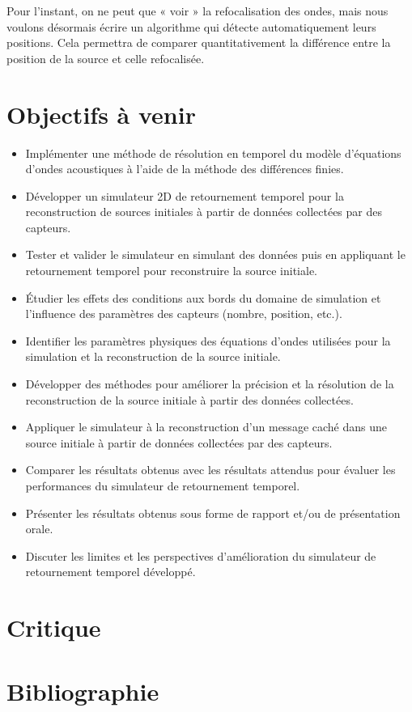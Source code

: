 \documentclass[11pt, a4paper]{article}
\begin{document}
Pour l'instant, on ne peut que « voir » la refocalisation des ondes, mais nous voulons désormais écrire un algorithme qui détecte automatiquement leurs positions. Cela permettra de comparer quantitativement la différence entre la position de la source et celle refocalisée.

\section{Objectifs à venir}
\begin{itemize}
    \item Implémenter une méthode de résolution en temporel du modèle d'équations d'ondes acoustiques à l'aide de la méthode des différences finies.
    \item Développer un simulateur 2D de retournement temporel pour la reconstruction de sources initiales à partir de données collectées par des capteurs.
    \item Tester et valider le simulateur en simulant des données puis en appliquant le retournement temporel pour reconstruire la source initiale.
    \item Étudier les effets des conditions aux bords du domaine de simulation et l'influence des paramètres des capteurs (nombre, position, etc.).
    \item Identifier les paramètres physiques des équations d'ondes utilisées pour la simulation et la reconstruction de la source initiale.
    \item Développer des méthodes pour améliorer la précision et la résolution de la reconstruction de la source initiale à partir des données collectées.
    \item Appliquer le simulateur à la reconstruction d'un message caché dans une source initiale à partir de données collectées par des capteurs.
    \item Comparer les résultats obtenus avec les résultats attendus pour évaluer les performances du simulateur de retournement temporel.
    \item Présenter les résultats obtenus sous forme de rapport et/ou de présentation orale.
    \item Discuter les limites et les perspectives d'amélioration du simulateur de retournement temporel développé.
\end{itemize}
\section{Critique}
\section{Bibliographie}
\end{document}
